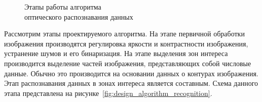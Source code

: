 \begin{figure}[h!]
  \centering
  \caption{Этапы работы алгоритма \\ оптического распознавания данных}
  \label{fig:design_algorithm_basic}
\end{figure}

Рассмотрим этапы проектируемого алгоритма.
На этапе первичной обработки изображения производятся
регулировка яркости и контрастности изображения,
устранение шумов и его бинаризация.
На этапе выделения зон интереса производится выделение частей изображения,
представляющих собой числовые данные.
Обычно это производится на основании данных о контурах изображения.
Этап распознавания данных в зонах интереса является составным.
Схема данного этапа представлена на рисунке~\ref{fig:design_algorithm_recognition}.

